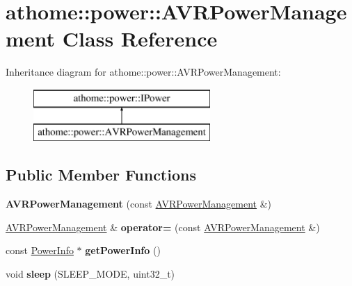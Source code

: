 \hypertarget{classathome_1_1power_1_1_a_v_r_power_management}{}\section{athome\+:\+:power\+:\+:A\+V\+R\+Power\+Management Class Reference}
\label{classathome_1_1power_1_1_a_v_r_power_management}
Inheritance diagram for athome\+:\+:power\+:\+:A\+V\+R\+Power\+Management\+:\begin{figure}[H]
\begin{center}
\leavevmode
\includegraphics[height=2.000000cm]{classathome_1_1power_1_1_a_v_r_power_management}
\end{center}
\end{figure}
\subsection*{Public Member Functions}
\begin{DoxyCompactItemize}
\item 
\mbox{\label{classathome_1_1power_1_1_a_v_r_power_management_ae272a5c17f8cad814f7da51324f96757}} 
{\bfseries A\+V\+R\+Power\+Management} (const \mbox{\hyperlink{classathome_1_1power_1_1_a_v_r_power_management}{A\+V\+R\+Power\+Management}} \&)
\item 
\mbox{\label{classathome_1_1power_1_1_a_v_r_power_management_aca40015de3d71ec77b2ef4ad458a0db1}} 
\mbox{\hyperlink{classathome_1_1power_1_1_a_v_r_power_management}{A\+V\+R\+Power\+Management}} \& {\bfseries operator=} (const \mbox{\hyperlink{classathome_1_1power_1_1_a_v_r_power_management}{A\+V\+R\+Power\+Management}} \&)
\item 
\mbox{\label{classathome_1_1power_1_1_a_v_r_power_management_a8d335811814a50460c9b6d705eab46e2}} 
const \mbox{\hyperlink{structathome_1_1power_1_1_i_power_1_1_power_info}{Power\+Info}} $\ast$ {\bfseries get\+Power\+Info} ()
\item 
\mbox{\label{classathome_1_1power_1_1_a_v_r_power_management_a14aef66965c95b5855a7375e80d93721}} 
void {\bfseries sleep} (S\+L\+E\+E\+P\+\_\+\+M\+O\+DE, uint32\+\_\+t)
\end{DoxyCompactItemize}
